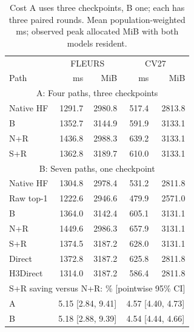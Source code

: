 \begin{table}[!b]\centering\footnotesize
\caption{Cost A uses three checkpoints, B one; each has three paired rounds. Mean population-weighted ms; observed peak allocated MiB with both models resident.}\label{tab:cost}
\setlength{\tabcolsep}{4pt}\renewcommand{\arraystretch}{1.03}
\begin{tabular}{@{}lrrrr@{}}\toprule
 & \multicolumn{2}{c}{FLEURS} & \multicolumn{2}{c}{CV27}\\
Path & ms & MiB & ms & MiB\\\midrule
\multicolumn{5}{c}{A: Four paths, three checkpoints}\\
Native HF & 1291.7 & 2980.8 & 517.4 & 2813.8\\
B & 1352.7 & 3144.9 & 591.9 & 3133.1\\
N+R & 1436.8 & 2988.3 & 639.2 & 3133.1\\
S+R & 1362.8 & 3189.7 & 610.0 & 3133.1\\
\midrule
\multicolumn{5}{c}{B: Seven paths, one checkpoint}\\
Native HF & 1304.8 & 2978.4 & 531.2 & 2811.8\\
Raw top-1 & 1222.6 & 2946.6 & 479.9 & 2571.0\\
B & 1364.0 & 3142.4 & 605.1 & 3131.1\\
N+R & 1449.6 & 2986.3 & 657.9 & 3131.1\\
S+R & 1374.5 & 3187.2 & 628.0 & 3131.1\\
Direct & 1372.8 & 3187.2 & 625.8 & 2811.8\\
H3Direct & 1314.0 & 3187.2 & 586.4 & 2811.8\\
\midrule
\multicolumn{5}{c}{S+R saving versus N+R: \% [pointwise 95\% CI]}\\
A & \multicolumn{2}{c}{5.15 [2.84, 9.41]} & \multicolumn{2}{c}{4.57 [4.40, 4.73]}\\
B & \multicolumn{2}{c}{5.18 [2.88, 9.39]} & \multicolumn{2}{c}{4.54 [4.44, 4.66]}\\
\bottomrule\end{tabular}\end{table}

